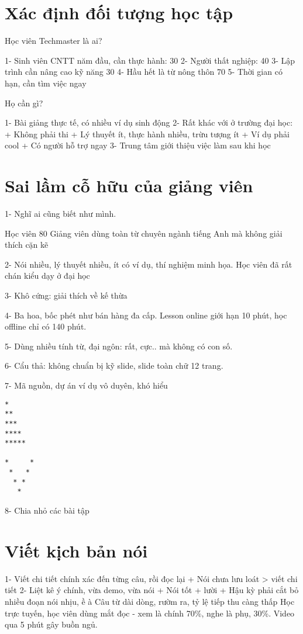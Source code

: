 \section{Xác định đối tượng học tập}

Học viên Techmaster là ai?

1- Sinh viên CNTT năm đầu, cần thực hành: 30%
2- Người thất nghiệp: 40%
3- Lập trình cần nâng cao kỹ năng 30%
4- Hầu hết là từ nông thôn 70%
5- Thời gian có hạn, cần tìm việc ngay

Họ cần gì?

1- Bài giảng thực tế, có nhiều ví dụ sinh động
2- Rất khác với ở trường đại học:
+ Không phải thi
+ Lý thuyết ít, thực hành nhiều, trừu tượng ít
+ Ví dụ phải cool
+ Có người hỗ trợ ngay
3- Trung tâm giới thiệu việc làm sau khi học

\section{Sai lầm cỗ hữu của giảng viên}

1- Nghĩ ai cũng biết như mình.

Học viên 80%
Giảng viên dùng toàn từ chuyên ngành tiếng Anh mà không giải thích cặn kẽ

2- Nói nhiều, lý thuyết nhiều, ít có ví dụ, thí nghiệm minh họa. Học viên đã rất chán kiểu dạy ở đại học

3- Khô cứng: giải thích về kế thừa

4- Ba hoa, bốc phét như bán hàng đa cấp. Lesson online giới hạn 10 phút, học offline chỉ có 140 phút.

5- Dùng nhiều tính từ, đại ngôn: rất, cực.. mà không có con số.

6- Cẩu thả: không chuẩn bị kỹ slide, slide toàn chữ
12 trang.

7- Mã nguồn, dự án ví dụ vô duyên, khó hiểu

\begin{lstlisting}
*
**
***
****
*****

*     *
 *   *
  * *
   *
\end{lstlisting}

8- Chia nhỏ các bài tập

\section{Viết kịch bản nói}

1- Viết chi tiết chính xác đến từng câu, rồi đọc lại
+ Nói chưa lưu loát > viết chi tiết
2- Liệt kê ý chính, vừa demo, vừa nói
+ Nói tốt + lười
+ Hậu kỳ phải cắt bỏ nhiều đoạn nói nhịu, ề à
Câu từ dài dòng, rườm ra, tỷ lệ tiếp thu càng thấp
Học trực tuyến, học viên dùng mắt đọc - xem là chính 70\%, nghe là phụ, 30\%. Video qua 5 phút gây buồn ngủ.

